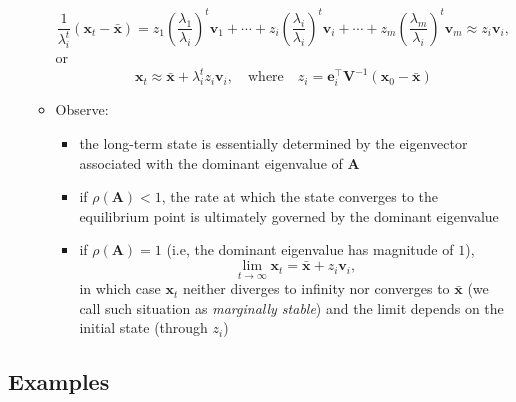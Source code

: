 \documentclass[12pt,a4paper]{article}
\begin{document}
\begin{itemize}
\begin{itemize}
\begin{equation}
      \frac{1}{\lambda_{i}^{t}}(\bm{x}_{t} - \bar{\bm{x}})
      = z_{1}\left(\frac{\lambda_{1}}{\lambda_{i}}\right)^{t}\bm{v}_{1}
      + \cdots
      + z_{i}\left(\frac{\lambda_{i}}{\lambda_{i}}\right)^{t}\bm{v}_{i}
      + \cdots
      + z_{m}\left(\frac{\lambda_{m}}{\lambda_{i}}\right)^{t}\bm{v}_{m}
      \approx
      z_{i}\bm{v}_{i},
    \end{equation}
    or
    \begin{equation}\nonumber%
      \bm{x}_{t} \approx \bar{\bm{x}} + \lambda_{i}^{t}z_{i}\bm{v}_{i},
      \quad\text{where}\quad
      z_{i} = \bm{e}_{i}^{\top}\bm{V}^{-1}(\bm{x}_{0}-\bar{\bm{x}})
    \end{equation}
  \item Observe:
    \begin{itemize}
      \item the long-term state is essentially determined by the eigenvector associated with the dominant eigenvalue of $\bm{A}$
      \item if $\rho(\bm{A})<1$, the rate at which the state converges to the equilibrium point
        is ultimately governed by the dominant eigenvalue
      \item if $\rho(\bm{A})=1$ (i.e, the dominant eigenvalue has magnitude of $1$),
        \begin{equation}\nonumber%
          \lim_{t\to \infty}\bm{x}_{t} = \bar{\bm{x}} + z_{i}\bm{v}_{i},
        \end{equation}
        in which case $\bm{x}_{t}$ neither diverges to infinity nor converges to $\bar{\bm{x}}$
        (we call such situation as \emph{marginally stable})
        and the limit depends on the initial state (through $z_{i}$)
        
    \end{itemize}
    
  \end{itemize}

\end{itemize}

\subsection{Examples}
\end{document}
